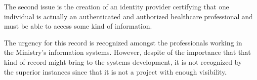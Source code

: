 The second issue is the creation of an identity provider certifying that one individual is actually an authenticated and authorized healthcare professional and must be able to access some kind of information.

The urgency for this record is recognized amongst the professionals working in the Ministry's information systems. However, despite of the importance that that kind of record might bring to the systems development, it is not recognized by the superior instances since that it is not a project with enough visibility.


